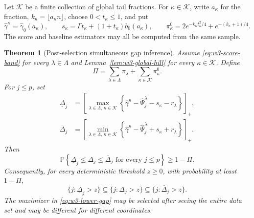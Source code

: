 \documentclass[11pt]{article}
\newtheorem{theorem}{Theorem}[section]
\theoremstyle{remark}
\newcommand{\Pp}{\mathbb P}
\begin{document}
Let $\mathcal K$ be a finite collection of global tail fractions.  For
$\kappa\in\mathcal K$, write
$a_\kappa$ for the fraction, $k_\kappa=\lfloor a_\kappa n\rfloor$, choose
$0<t_\kappa\le1$, and put
\begin{equation}
 \widehat\gamma^\kappa=\widehat\gamma_0(a_\kappa),
 \qquad
 s_\kappa=\Gamma t_\kappa+(1+t_\kappa)b_0(a_\kappa),
 \qquad
 \pi_\kappa^0=2e^{-k_\kappa t_\kappa^2/4}
                  +e^{-(k_\kappa+1)/4}.
 \label{eq:w3-global-candidates}
\end{equation}
The score and baseline estimators may all be computed from the same sample.

\begin{theorem}[Post-selection simultaneous gap inference]
\label{thm:w3-simultaneous}
Assume \eqref{eq:w3-score-band} for every $\lambda\in\Lambda$ and
Lemma~\ref{lem:w3-global-hill} for every $\kappa\in\mathcal K$.  Define
\begin{equation}
 \Pi=\sum_{\lambda\in\Lambda}\pi_\lambda
     +\sum_{\kappa\in\mathcal K}\pi_\kappa^0.
 \label{eq:w3-total-failure}
\end{equation}
For $j\le p$, set
\begin{align}
 \underline\Delta_j
 &=\left[
   \max_{\lambda\in\Lambda,\,\kappa\in\mathcal K}
   \left\{
    \widehat\gamma^\kappa-\widehat\Psi_j^\lambda
    -s_\kappa-r_\lambda
   \right\}
   \right]_+,
 \label{eq:w3-lower-gap}\\
 \overline\Delta_j
 &=\left[
   \min_{\lambda\in\Lambda,\,\kappa\in\mathcal K}
   \left\{
    \widehat\gamma^\kappa-\widehat\Psi_j^\lambda
    +s_\kappa+r_\lambda
   \right\}
   \right]_+.
 \label{eq:w3-upper-gap}
\end{align}
Then
\begin{equation}
 \Pp\left\{
 \underline\Delta_j\le\Delta_j\le\overline\Delta_j
 \text{ for every }j\le p
 \right\}\ge1-\Pi.
 \label{eq:w3-simultaneous-coverage}
\end{equation}
Consequently, for every deterministic threshold $z\ge0$, with probability at
least $1-\Pi$,
\begin{equation}
 \{j:\underline\Delta_j>z\}
 \subseteq
 \{j:\Delta_j>z\}
 \subseteq
 \{j:\overline\Delta_j>z\}.
 \label{eq:w3-levelset-sandwich}
\end{equation}
The maximizer in \eqref{eq:w3-lower-gap} may be selected after seeing the
entire data set and may be different for different coordinates.
\end{theorem}
\end{document}
